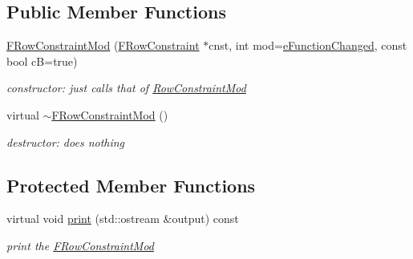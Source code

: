 \subsection*{Public Member Functions}
\begin{DoxyCompactItemize}
\item 
\mbox{\label{class_s_m_spp__di__unipi__it_1_1_f_row_constraint_mod_a86873c24584b5f2fd30c4f87158719ff}} 
\mbox{\hyperlink{class_s_m_spp__di__unipi__it_1_1_f_row_constraint_mod_a86873c24584b5f2fd30c4f87158719ff}{F\+Row\+Constraint\+Mod}} (\mbox{\hyperlink{class_s_m_spp__di__unipi__it_1_1_f_row_constraint}{F\+Row\+Constraint}} $\ast$cnst, int mod=\mbox{\hyperlink{class_s_m_spp__di__unipi__it_1_1_f_row_constraint_mod_af140985c04c8a274ecc353a0eee2debba2d56f392a43ca0db9b27247c7d60b944}{e\+Function\+Changed}}, const bool cB=true)
\begin{DoxyCompactList}\small\item\em constructor\+: just calls that of \mbox{\hyperlink{class_s_m_spp__di__unipi__it_1_1_row_constraint_mod}{Row\+Constraint\+Mod}} \end{DoxyCompactList}\item 
\mbox{\label{class_s_m_spp__di__unipi__it_1_1_f_row_constraint_mod_aa3bfc4738d219793a14b6c09a6f304d5}} 
virtual \mbox{\hyperlink{class_s_m_spp__di__unipi__it_1_1_f_row_constraint_mod_aa3bfc4738d219793a14b6c09a6f304d5}{$\sim$\+F\+Row\+Constraint\+Mod}} ()
\begin{DoxyCompactList}\small\item\em destructor\+: does nothing \end{DoxyCompactList}\end{DoxyCompactItemize}
\subsection*{Protected Member Functions}
\begin{DoxyCompactItemize}
\item 
\mbox{\label{class_s_m_spp__di__unipi__it_1_1_f_row_constraint_mod_a2e7b9c9148a98c5c342e8c25cac95926}} 
virtual void \mbox{\hyperlink{class_s_m_spp__di__unipi__it_1_1_f_row_constraint_mod_a2e7b9c9148a98c5c342e8c25cac95926}{print}} (std\+::ostream \&output) const
\begin{DoxyCompactList}\small\item\em print the \mbox{\hyperlink{class_s_m_spp__di__unipi__it_1_1_f_row_constraint_mod}{F\+Row\+Constraint\+Mod}} \end{DoxyCompactList}\end{DoxyCompactItemize}
